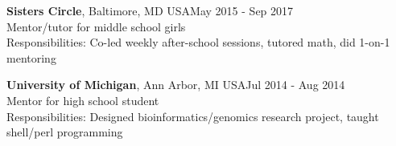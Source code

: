 \documentclass[margin,line]{res}
\begin{document}
\begin{resume}
{\bf Sisters Circle}, Baltimore, MD USA\hfill {May 2015 - Sep 2017}\\
Mentor/tutor for middle school girls\\
Responsibilities: Co-led weekly after-school sessions, tutored math, did 1-on-1 mentoring

{\bf University of Michigan}, Ann Arbor, MI USA\hfill {Jul 2014 - Aug 2014}\\
Mentor for high school student\\
Responsibilities: Designed bioinformatics/genomics research project, taught shell/perl programming




\end{resume}
\end{document}
